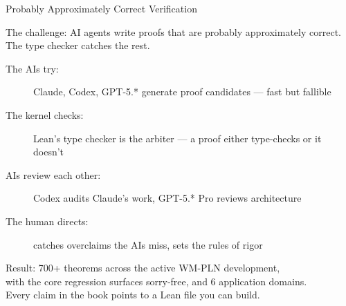 \documentclass[aspectratio=169,11pt]{beamer}
\begin{document}
\begin{frame}{Probably Approximately Correct Verification}

The challenge: AI agents write proofs that are \alert{probably
approximately correct}. The type checker catches the rest.

\bigskip
\begin{description}
\item[The AIs try:] Claude, Codex, GPT-5.* generate proof
  candidates --- fast but fallible
\item[The kernel checks:] Lean's type checker is the arbiter ---
  a proof either type-checks or it doesn't
\item[AIs review each other:] Codex audits Claude's work,
  GPT-5.* Pro reviews architecture
\item[The human directs:] catches overclaims the AIs miss,
  sets the rules of rigor
\end{description}

\medskip
Result: 700+ theorems across the active WM-PLN development,\\
with the core regression surfaces sorry-free, and 6 application domains.\\
Every claim in the book points to a Lean file you can build.

\end{frame}
\end{document}
